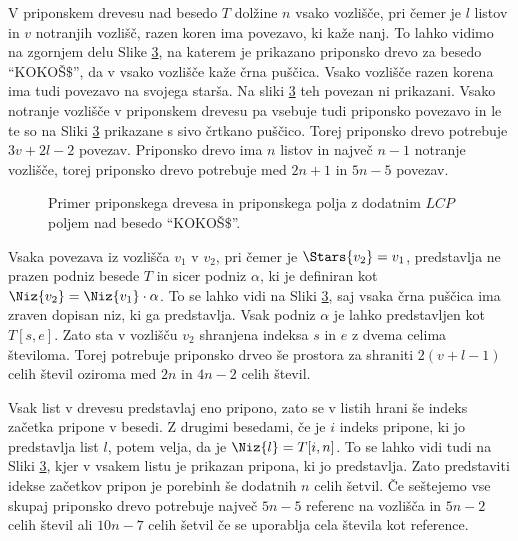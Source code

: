 V priponskem drevesu nad besedo $T$ dolžine $n$ vsako vozlišče, pri čemer je $l$ listov in $v$ notranjih vozlišč, razen koren ima povezavo, ki kaže nanj. To lahko vidimo na zgornjem delu Slike \ref{fig:SuffuxArray}, na katerem je prikazano priponsko drevo za besedo \enquote{KOKOŠ$\$$}, da v vsako vozlišče kaže črna puščica. Vsako vozlišče razen korena ima tudi povezavo na svojega starša. Na sliki \ref{fig:SuffuxArray} teh povezan ni prikazani. Vsako notranje vozlišče v priponskem drevesu pa vsebuje tudi priponsko povezavo in le te so na Sliki \ref{fig:SuffuxArray} prikazane s sivo črtkano puščico. Torej priponsko drevo potrebuje $3v+2l-2$ povezav. Priponsko drevo ima $n$ listov in največ $n-1$ notranje vozlišče, torej priponsko drevo potrebuje med $2n+1$ in $5n -5$ povezav.

\begin{figure}[htb]
    \begin{subfigure}[t]{\linewidth}
        
        
        \centering
        \subcaption*{}
        \label{fig:bSADrevo}
    \end{subfigure}
    \begin{subfigure}[t]{1\linewidth}        
        
        \centering
        \subcaption*{}
        \label{fig:bSAPolje}
    \end{subfigure}
    \caption{Primer priponskega drevesa in priponskega polja z dodatnim $LCP$ poljem nad besedo \enquote{KOKOŠ$\$$}.} 
    \label{fig:SuffuxArray}
\end{figure}

Vsaka povezava iz vozlišča $v_1$ v $v_2$, pri čemer je $\Stars{v_2}=v_1$, predstavlja ne prazen podniz besede $T$ in sicer podniz $\alpha$, ki je definiran kot $\Niz{v_2}=\Niz{v_1}\cdot\alpha$. To se lahko vidi na Sliki \ref{fig:SuffuxArray}, saj vsaka črna puščica ima zraven dopisan niz, ki ga predstavlja. Vsak podniz $\alpha$ je lahko predstavljen kot $T[s,e]$. Zato sta v vozlišču $v_2$ shranjena indeksa $s$ in $e$ z dvema celima številoma. Torej potrebuje priponsko drveo še prostora za shraniti $2(v+l-1)$ celih števil oziroma med $2n$ in $4n-2$ celih števil.

Vsak list v drevesu predstavlaj eno pripono, zato se v listih hrani še indeks začetka pripone v besedi. Z drugimi besedami, če je $i$ indeks pripone, ki jo predstavlja list $l$, potem velja, da je $\Niz{l}=T[i,n]$. To se lahko vidi tudi na Sliki \ref{fig:SuffuxArray}, kjer v vsakem listu je prikazan pripona, ki jo predstavlja. Zato predstaviti idekse začetkov pripon je porebinh še dodatnih $n$ celih šetvil. Če seštejemo vse skupaj priponsko drevo potrebuje največ $5n-5$ referenc na vozlišča in $5n-2$ celih števil ali $10n-7$ celih šetvil če se uporablja cela števila kot reference.


